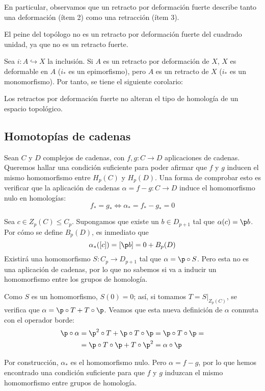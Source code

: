 En particular, observamos que un retracto por deformación fuerte describe
tanto una deformación (ítem 2) como una retracción (ítem 3).

\begin{example}
El peine del topólogo no es un retracto por deformación fuerte del cuadrado
unidad, ya que no es un retracto fuerte.
\end{example}

Sea $i\colon A \hookrightarrow X$ la inclusión. Si $A$ es un retracto por
deformación de $X$, $X$ es deformable en $A$ ($i_*$ es un epimorfismo), pero
$A$ es un retracto de $X$ ($i_*$ es un monomorfismo). Por tanto, se tiene el
siguiente corolario:

\begin{corollary}\label{RDFHomo}
Los retractos por deformación fuerte no alteran el tipo de homología de un
espacio topológico.
\end{corollary}

\subsection{Homotopías de cadenas}
Sean $C$ y $D$ complejos de cadenas, con $f,g\colon C \to D$ aplicaciones de
cadenas. Queremos hallar una condición suficiente para poder afirmar que $f$ y $g$
inducen el mismo homomorfismo entre $H_p(C)$ y $H_p(D)$. Una forma de comprobar
esto es verificar que la aplicación de cadenas $\alpha=f-g\colon C \to D$ induce
el homomorfismo nulo en homologías:
\[f_*=g_* \iff \alpha_*=f_*-g_*=0\]

Sea $c \in Z_p(C) \leq C_p$. Supongamos que existe un $b \in D_{p+1}$ tal que
$\alpha(c)=\p b$. Por cómo se define $B_p(D)$, es inmediato que
\[\alpha_*([c])=[\p b]=0+B_p(D)\]
Existirá una homomorfismo $S\colon C_p \to D_{p+1}$ tal que $\alpha=\p \circ S$.
Pero esta no es una aplicación de cadenas, por lo que no sabemos si va a inducir
un homomorfismo entre los grupos de homología.

Como $S$ es un homomorfismo, $S(0)=0$; así, si tomamos $T=S|_{Z_p(C)}$, se
verifica que $\alpha=\p \circ T + T \circ \p$. Veamos que esta nueva definición
de $\alpha$ conmuta con el operador borde:
\begin{align*}
\p \circ \alpha &=
\p^2 \circ T+\p \circ T \circ \p =
\p \circ T \circ \p=\\
&=\p \circ T \circ \p + T \circ \p^2 =
\alpha \circ \p
\end{align*}

Por construcción, $\alpha_*$ es el homomorfismo nulo. Pero $\alpha=f-g$, por lo
que hemos encontrado una condición suficiente para que $f$ y $g$ induzcan el
mismo homomorfismo entre grupos de homología.

